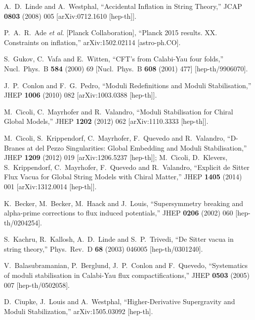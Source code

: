 \documentclass[11pt,a4paper]{article}
\begin{document}
\begin{thebibliography}{99}
  A.~D.~Linde and A.~Westphal,
  ``Accidental Inflation in String Theory,''
  JCAP {\bf 0803} (2008) 005
  [arXiv:0712.1610 [hep-th]].

  P.~A.~R.~Ade {\it et al.} [Planck Collaboration],
  ``Planck 2015 results. XX. Constraints on inflation,''
  arXiv:1502.02114 [astro-ph.CO].

  S.~Gukov, C.~Vafa and E.~Witten,
  ``CFT's from Calabi-Yau four folds,''
  Nucl.\ Phys.\ B {\bf 584} (2000) 69
   [Nucl.\ Phys.\ B {\bf 608} (2001) 477]
  [hep-th/9906070].

  J.~P.~Conlon and F.~G.~Pedro,
  ``Moduli Redefinitions and Moduli Stabilisation,''
  JHEP {\bf 1006} (2010) 082
  [arXiv:1003.0388 [hep-th]].

  M.~Cicoli, C.~Mayrhofer and R.~Valandro,
  ``Moduli Stabilisation for Chiral Global Models,''
  JHEP {\bf 1202} (2012) 062
  [arXiv:1110.3333 [hep-th]].

  M.~Cicoli, S.~Krippendorf, C.~Mayrhofer, F.~Quevedo and R.~Valandro,
  ``D-Branes at del Pezzo Singularities: Global Embedding and Moduli Stabilisation,''
  JHEP {\bf 1209} (2012) 019
  [arXiv:1206.5237 [hep-th]];
M.~Cicoli, D.~Klevers, S.~Krippendorf, C.~Mayrhofer, F.~Quevedo and R.~Valandro,
  ``Explicit de Sitter Flux Vacua for Global String Models with Chiral Matter,''
  JHEP {\bf 1405} (2014) 001
  [arXiv:1312.0014 [hep-th]].

  K.~Becker, M.~Becker, M.~Haack and J.~Louis,
  ``Supersymmetry breaking and alpha-prime corrections to flux induced potentials,''
  JHEP {\bf 0206} (2002) 060
  [hep-th/0204254].

  S.~Kachru, R.~Kallosh, A.~D.~Linde and S.~P.~Trivedi,
  ``De Sitter vacua in string theory,''
  Phys.\ Rev.\ D {\bf 68} (2003) 046005
  [hep-th/0301240].

  V.~Balasubramanian, P.~Berglund, J.~P.~Conlon and F.~Quevedo,
  ``Systematics of moduli stabilisation in Calabi-Yau flux compactifications,''
  JHEP {\bf 0503} (2005) 007
  [hep-th/0502058].

  D.~Ciupke, J.~Louis and A.~Westphal,
  ``Higher-Derivative Supergravity and Moduli Stabilization,''
  arXiv:1505.03092 [hep-th].
  

\end{thebibliography}
\end{document}
